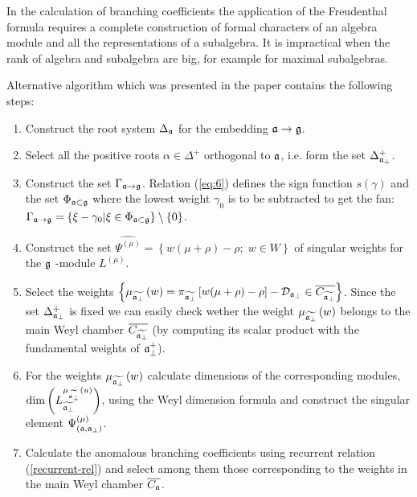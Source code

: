 In the calculation of branching coefficients the application of the Freudenthal formula requires a complete construction of formal characters of an algebra module and all the representations of a subalgebra. It is impractical when the rank of algebra and subalgebra are big, for example for maximal subalgebras.

Alternative algorithm which was presented in the paper \cite{2010arXiv1007.0318L}  contains the following steps:

\begin{enumerate}
\item  Construct the root system $\Delta _{\mathfrak{a}}$ for the embedding $%
\af\rightarrow \frak{g}$.

\item  Select all the positive roots $\alpha \in \Delta ^{+}$ orthogonal
to  $\mathfrak{a}$, i.e. form the set $\Delta_{\mathfrak{a}_{\bot} }^{+}$.

\item  Construct the set $\Gamma _{\mathfrak{a}\rightarrow \frak{g}}$. Relation
 (\ref{eq:6}) defines the sign function
 $s(\gamma)$ and the set $\Phi_{\mathfrak{a}\subset \frak{g}}$ where the lowest weight
 $\gamma_0$ is to be subtracted to get the fan:
 $\Gamma _{\af\rightarrow \frak{g}}=\left\{ \xi -\gamma _{0}|\xi \in \Phi _{%
\af\subset \frak{g}}\right\} \setminus \left\{ 0\right\}$.

\item  Construct the set $\widehat{\Psi ^{(\mu )}}=\left\{ w (\mu +\rho
)-\rho ;\;w \in W\right\} $ of singular weights for the $\frak{g}$%
-module $L^{(\mu )}$.

\item  Select the weights $\left\{ \mu _{\widetilde{\af_{\perp }}%
}\left( w\right) =\pi _{\widetilde{\af_{\perp }}}\left[ w(\mu +\rho
)-\rho \right] -\mathcal{D}_{\af_{\perp }}\in \overline{C_{\widetilde{%
\af_{\perp }}}}\right\} $. Since the set $\Delta_{\mathfrak{a}_{\bot} }^{+}$ is fixed
we can easily check wether the weight $\mu _{\widetilde{\af_{\perp }}%
}\left( w\right) $ belongs to the main Weyl chamber $\overline{C_{\widetilde{%
\af_{\perp }}}}$ (by computing its scalar product with the fundamental
weights of $\mathfrak{a}_{\bot}^{+}$).

\item  For the weights $\mu _{\widetilde{\mathfrak{a}_{\perp }}}\left( w\right) $
calculate dimensions of the corresponding modules, $\mathrm{\dim }\left(
L_{\widetilde{\af_{\perp }}}^{\mu _{\widetilde{\af_{\perp }}%
}\left( u\right) }\right) $, using the Weyl dimension formula and construct
the singular element $\Psi ^{\left( \mu \right) }_{\left(  \mathfrak{a}, \mathfrak{a}_{\bot} \right)}$.

\item  Calculate the anomalous branching coefficients using 
recurrent relation (\ref{recurrent-rel}) and select among them those
corresponding to the weights in the main Weyl
chamber $\overline{C_{\mathfrak{a}}}$.
\end{enumerate}

